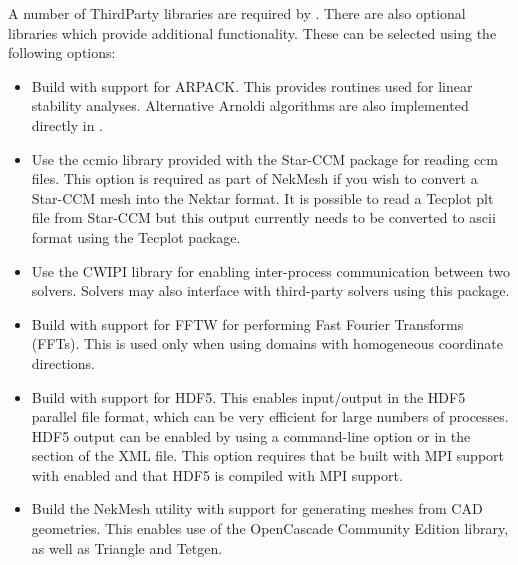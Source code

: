 A number of ThirdParty libraries are required by \nekpp. There are
also optional libraries which provide additional functionality. These
can be selected using the following options:
\begin{itemize}
    \item {}

    Build \nekpp with support for ARPACK. This provides routines used for
    linear stability analyses. Alternative Arnoldi algorithms are also
    implemented directly in \nekpp.

    \item {}

    Use the ccmio library provided with the Star-CCM package for
    reading ccm files. This option is required as part of NekMesh
    if you wish to convert a Star-CCM mesh into the Nektar format. It
    is possible to read a Tecplot plt file from Star-CCM but this
    output currently needs to be converted to ascii format using the
    Tecplot package.

    \item {}
    
    Use the CWIPI library for enabling inter-process communication between two solvers. Solvers may also interface with third-party solvers using this package.
    
    \item {}

    Build \nekpp with support for FFTW for performing Fast Fourier Transforms
    (FFTs). This is used only when using domains with homogeneous coordinate
    directions.

    \item {}

    Build \nekpp with support for HDF5. This enables input/output in the HDF5
    parallel file format, which can be very efficient for large numbers of
    processes. HDF5 output can be enabled by using a command-line option or
    in the  section of the XML file. This option requires 
    that \nekpp be built with MPI support with  enabled
    and that HDF5 is compiled with MPI support.

    \item {}
    
    Build the NekMesh utility with support for generating meshes from CAD geometries. This enables use of the OpenCascade Community Edition library, as well as Triangle and Tetgen.
    

\end{itemize}

